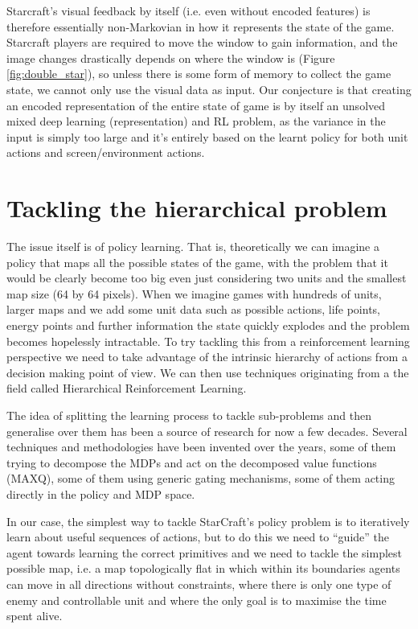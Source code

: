 \documentclass[bsc,frontabs,twoside,parskip,deptreport]{infthesis}     %
\begin{document}
Starcraft’s visual feedback by itself (i.e. even without encoded features) is
therefore essentially non-Markovian in how it represents the state of the game.
Starcraft players are required to move the window to gain information, and the
image changes drastically depends on where the window is (Figure
\ref{fig:double_star}), so unless there is some form of memory to collect the
game state, we cannot only use the visual data as input. Our conjecture is that
creating an encoded representation of the entire state of game is by itself an
unsolved mixed deep learning (representation) and RL problem, as the variance in
the input is simply too large and it's entirely based on the learnt policy for
both unit actions and screen/environment actions.

\section{Tackling the hierarchical problem}

The issue itself is of policy learning. That is, theoretically we can imagine a
policy that maps all the possible states of the game, with the problem that it
would be clearly become too big even just considering two units and the smallest
map size (64 by 64 pixels). When we imagine games with hundreds of units, larger
maps and we add some unit data such as possible actions, life points, energy
points and further information the state quickly explodes and the problem
becomes hopelessly intractable. To try tackling this from a reinforcement
learning perspective we need to take advantage of the intrinsic hierarchy of
actions from a decision making point of view. We can then use techniques
originating from a the field called Hierarchical Reinforcement Learning.

The idea of splitting the learning process to tackle sub-problems and then
generalise over them has been a source of research for now a few decades.
Several techniques and methodologies have been invented over the years, some of
them trying to decompose the MDPs\cite{marthi2005concurrent} and act on the
decomposed value functions (MAXQ)\cite{dietterich2000hierarchical}, some of them
using generic gating mechanisms\cite{watkins1989learning}, some of them acting
directly in the policy and MDP space\cite{stolle2002learning}.

In our case, the simplest way to tackle StarCraft's policy problem is to
iteratively learn about useful sequences of actions, but to do this we need to
``guide'' the agent towards learning the correct primitives and we need to
tackle the simplest possible map, i.e. a map topologically flat in which within
its boundaries agents can move in all directions without constraints, where
there is only one type of enemy and controllable unit and where the only goal is
to maximise the time spent alive.
\end{document}
